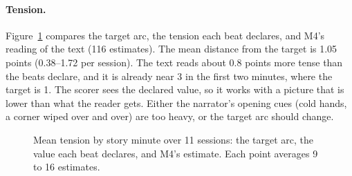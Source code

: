 \documentclass{article}
\begin{document}
\paragraph{Tension.}
Figure~\ref{fig:tension} compares the target arc, the tension each beat declares, and M4's reading of the text (116 estimates). The mean distance from the target is 1.05 points (0.38--1.72 per session). The text reads about 0.8 points more tense than the beats declare, and it is already near 3 in the first two minutes, where the target is 1. The scorer sees the declared value, so it works with a picture that is lower than what the reader gets. Either the narrator's opening cues (cold hands, a corner wiped over and over) are too heavy, or the target arc should change.

\begin{figure}[t]
\centering
{}
\caption{Mean tension by story minute over 11 sessions: the target arc, the value each beat declares, and M4's estimate. Each point averages 9 to 16 estimates.}
\label{fig:tension}
\end{figure}
\end{document}
